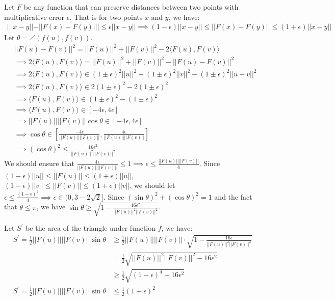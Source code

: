 Let $F$ be any function that can preserve distances between two points with multiplicative error $\epsilon$.
That is for two points $x$ and $y$, we have:
\begin{align}
    \nonumber |||x-y||-||F(x)-F(y)||| \le \epsilon ||x-y|| \implies
    (1-\epsilon)||x-y||\le||F(x)-F(y)||\le(1+\epsilon)||x-y||
\end{align}
Let $\theta=\angle(f(u),f(v))$.
\begin{align}
    \nonumber &||F(u)-F(v)||^2=||F(u)||^2+||F(v)||^2-2\langle F(u), F(v)\rangle\\
    \nonumber &\implies 2\langle F(u), F(v)\rangle =||F(u)||^2+||F(v)||^2-||F(u)-F(v)||^2\\
    \nonumber &\implies 2\langle F(u), F(v)\rangle\in (1\pm\epsilon)^2||u||^2+(1\pm\epsilon)^2||v||^2-(1\pm \epsilon)^2||u-v||^2\\
    \nonumber &\implies 2\langle F(u), F(v)\rangle\in  2(1\pm\epsilon)^2-2(1\pm \epsilon)^2\\
    \nonumber &\implies \langle F(u), F(v)\rangle\in (1\pm\epsilon)^2-(1\pm \epsilon)^2\\
    \nonumber &\implies \langle F(u), F(v)\rangle \in [-4\epsilon,4\epsilon]\\
    \nonumber &\implies ||F(u)||||F(v)|| \cos \theta \in [-4\epsilon,4\epsilon]\\
    \nonumber &\implies \cos \theta \in \left[\frac{-4\epsilon}{||F(u)||||F(v)||},\frac{4\epsilon}{||F(u)||||F(v)||}\right]\\
    \nonumber &\implies (\cos \theta)^2 \le \frac{16\epsilon^2}{||F(u)||^2||F(v)||^2}
\end{align}
We should ensure that $\frac{4\epsilon}{||F(u)||||F(v)||}\le1 \implies \epsilon \le \frac{||F(u)||||F(v)||}{4}$.
Since $(1-\epsilon) ||u||\le||F(u)||\le (1+\epsilon) ||u||$, $(1-\epsilon) ||v||\le||F(v)||\le (1+\epsilon) ||v||$,
we should let $ \epsilon \le \frac{(1-\epsilon)^2}{4}\implies \epsilon \in (0,3-2\sqrt{2}]$.
Since $(\sin\theta)^2+(\cos\theta)^2=1$ and the fact that $\theta\le\pi$, we have $\sin\theta \ge \sqrt{1-\frac{16\epsilon^2}{||F(u)||^2||F(v)||^2}}$.

Let $S^{\prime}$ be the area of the triangle under function $f$, we have:
\begin{align}
    \nonumber S^{\prime}=\frac{1}{2}||F(u)||||F(v)||\sin\theta &\ge \frac{1}{2}||F(u)||||F(v)||\cdot \sqrt{1-\frac{16\epsilon}{||F(u)||^2||F(v)||^2}}\\
    \nonumber &=\frac{1}{2}\sqrt{||F(u)||^2||F(v)||^2-16\epsilon^2}\\
    \nonumber &\ge \frac{1}{2}\sqrt{(1-\epsilon)^4-16\epsilon^2}\\
    \nonumber S^{\prime}=\frac{1}{2}||F(u)||||F(v)||\sin\theta &\le \frac{1}{2}(1+\epsilon)^2
\end{align}

